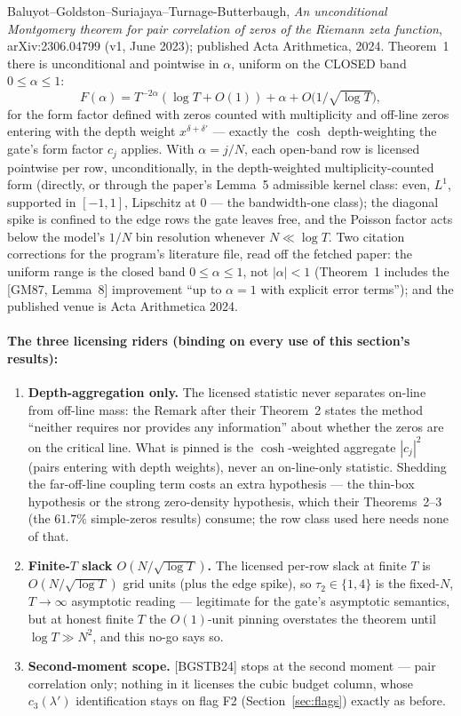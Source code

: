 \documentclass[11pt]{article}
\theoremstyle{plain}
\theoremstyle{definition}
\theoremstyle{remark}
\begin{document}
Baluyot--Goldston--Suriajaya--Turnage-Butterbaugh, \emph{An unconditional
Montgomery theorem for pair correlation of zeros of the Riemann zeta function},
arXiv:2306.04799 (v1, June 2023); published Acta Arithmetica, 2024. Theorem~1
there is unconditional and pointwise in $\alpha$, uniform on the CLOSED band
$0 \le \alpha \le 1$:
\[
  F(\alpha) = T^{-2\alpha}(\log T + O(1)) + \alpha
    + O\bigl(1/\sqrt{\log T}\bigr),
\]
for the form factor defined with zeros counted with multiplicity and off-line
zeros entering with the depth weight $x^{\delta + \delta'}$ --- exactly the
$\cosh$ depth-weighting the gate's form factor $c_j$ applies. With
$\alpha = j/N$, each open-band row is licensed pointwise per row,
unconditionally, in the depth-weighted multiplicity-counted form (directly, or
through the paper's Lemma~5 admissible kernel class: even, $L^1$, supported in
$[-1, 1]$, Lipschitz at $0$ --- the bandwidth-one class); the diagonal spike is
confined to the edge rows the gate leaves free, and the Poisson factor acts below
the model's $1/N$ bin resolution whenever $N \ll \log T$. Two citation
corrections for the program's literature file, read off the fetched paper: the
uniform range is the closed band $0 \le \alpha \le 1$, not $|\alpha| < 1$
(Theorem~1 includes the [GM87, Lemma~8] improvement ``up to $\alpha = 1$ with
explicit error terms''); and the published venue is Acta Arithmetica 2024.

\paragraph{The three licensing riders (binding on every use of this section's
results):}

\begin{enumerate}
\item \textbf{Depth-aggregation only.} The licensed statistic never separates
  on-line from off-line mass: the Remark after their Theorem~2 states the method
  ``neither requires nor provides any information'' about whether the zeros are on
  the critical line. What is pinned is the $\cosh$-weighted aggregate $|c_j|^2$
  (pairs entering with depth weights), never an on-line-only statistic. Shedding
  the far-off-line coupling term costs an extra hypothesis --- the thin-box
  hypothesis or the strong zero-density hypothesis, which their Theorems~2--3 (the
  $61.7\%$ simple-zeros results) consume; the row class used here needs none of
  that.
\item \textbf{Finite-$T$ slack $O(N/\sqrt{\log T})$.} The licensed per-row slack
  at finite $T$ is $O(N/\sqrt{\log T})$ grid units (plus the edge spike), so
  $\tau_2 \in \{1, 4\}$ is the fixed-$N$, $T \to \infty$ asymptotic reading ---
  legitimate for the gate's asymptotic semantics, but at honest finite $T$ the
  $O(1)$-unit pinning overstates the theorem until $\log T \gg N^2$, and this
  no-go says so.
\item \textbf{Second-moment scope.} [BGSTB24] stops at the second moment --- pair
  correlation only; nothing in it licenses the cubic budget column, whose
  $c_3(\lambda')$ identification stays on flag F2 (Section~\ref{sec:flags})
  exactly as before.
\end{enumerate}
\end{document}

